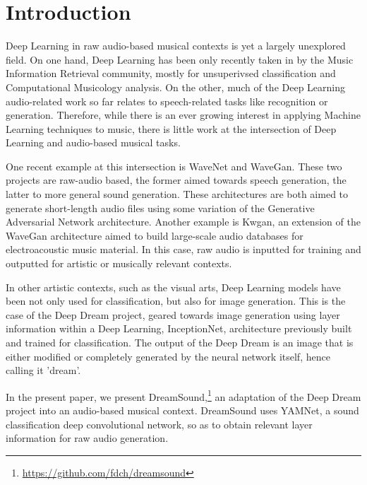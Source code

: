 \documentclass{nime-alternate}
\begin{document}

\section{Introduction}
Deep Learning in raw audio-based musical contexts is yet a largely unexplored field. On one hand, Deep Learning has been only recently taken in by the Music Information Retrieval community, mostly for unsuperivsed classification and Computational Musicology analysis. On the other, much of the Deep Learning audio-related work so far relates to speech-related tasks like recognition or generation. Therefore, while there is an ever growing interest in applying Machine Learning techniques to music, there is little work at the intersection of Deep Learning and audio-based musical tasks. 

One recent example at this intersection is WaveNet and WaveGan. These two projects are raw-audio based, the former aimed towards speech generation, the latter to more general sound generation. These architectures are both aimed to generate short-length audio files using some variation of the Generative Adversarial Network architecture. Another example is Kwgan, an extension of the WaveGan architecture aimed to build large-scale audio databases for electroacoustic music material. In this case, raw audio is inputted for training and outputted for artistic or musically relevant contexts.

In other artistic contexts, such as the visual arts, Deep Learning models have been not only used for classification, but also for image generation. This is the case of the Deep Dream project, geared towards image generation using layer information within a Deep Learning, InceptionNet, architecture previously built and trained for classification. The output of the Deep Dream is an image that is either modified or completely generated by the neural network itself, hence calling it 'dream'.

In the present paper, we present DreamSound,\footnote{\url{https://github.com/fdch/dreamsound}} an adaptation of the Deep Dream project into an audio-based musical context. DreamSound uses YAMNet, a sound classification deep convolutional network, so as to obtain relevant layer information for raw audio generation. 
\end{document}
